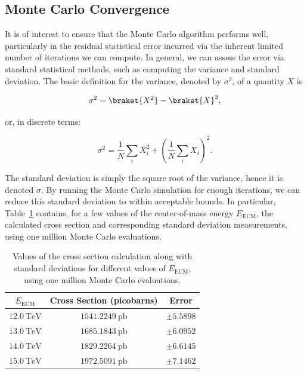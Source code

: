 \subsection{Monte Carlo Convergence}

It is of interest to ensure that the Monte Carlo algorithm performs well, particularly in the residual statistical error incurred via the inherent limited number of iterations we can compute. In general, we can assess the error via standard statistical methods, such as computing the variance and standard deviation. The basic definition for the variance, denoted by $\sigma^2$, of a quantity $X$ is

\begin{equation}
  \sigma^2 = \braket{X^2} - \braket{X}^2,
\end{equation}

or, in discrete terms:

\begin{equation}
  \sigma^2 = \frac{1}{N}\sum_i X_i^2 + \left( \frac{1}{N} \sum_i X_i \right)^2.
\end{equation}

The standard deviation is simply the square root of the variance, hence it is denoted $\sigma$. By running the Monte Carlo simulation for enough iterations, we can reduce this standard deviation to within acceptable bounds. In particular, Table~\ref{tbl:cross-section-error} contains, for a few values of the center-of-mass energy $E_{\mathrm{ECM}}$, the calculated cross section and corresponding standard deviation measurements, using one million Monte Carlo evaluations.

\begin{table}[h]
  \centering
  \begin{tabular}{|c|c|c|}
    \hline
    $E_{\mathrm{ECM}}$ & Cross Section (picobarns) & Error \\ \hline
    $\qty{12.0}{\tera\electronvolt}$ & $\qty{1541.2249}{\pico\barn}$ & $\pm 5.5898$ \\ \hline
    $\qty{13.0}{\tera\electronvolt}$ & $\qty{1685.1843}{\pico\barn}$ & $\pm 6.0952$ \\ \hline
    $\qty{14.0}{\tera\electronvolt}$ & $\qty{1829.2264}{\pico\barn}$ & $\pm 6.6145$ \\ \hline
    $\qty{15.0}{\tera\electronvolt}$ & $\qty{1972.5091}{\pico\barn}$ & $\pm 7.1462$ \\ \hline
  \end{tabular}
  \caption{Values of the cross section calculation along with standard deviations for different values of $E_{\mathrm{ECM}}$, using one million Monte Carlo evaluations.}
  \label{tbl:cross-section-error}
\end{table}

